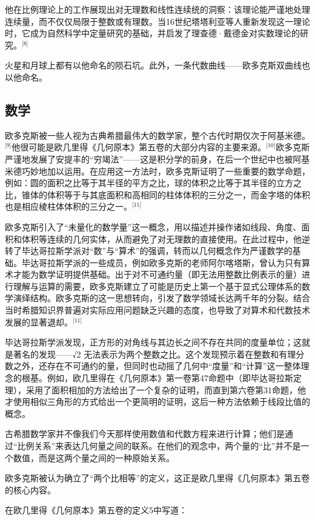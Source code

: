 他在比例理论上的工作展现出对无理数和线性连续统的洞察：该理论能严谨地处理连续量，而不仅仅局限于整数或有理数。当16世纪塔塔利亚等人重新发现这一理论时，它成为自然科学中定量研究的基础，并启发了理查德·戴德金对实数理论的研究。\(^\text{[8]}\)

火星和月球上都有以他命名的陨石坑。此外，一条代数曲线——欧多克斯双曲线也以他命名。
\subsection{数学}
欧多克斯被一些人视为古典希腊最伟大的数学家，整个古代时期仅次于阿基米德。\(^\text{[9]}\)他很可能是欧几里得《几何原本》第五卷的大部分内容的主要来源。\(^\text{[10]}\)欧多克斯严谨地发展了安提丰的“穷竭法”——这是积分学的前身，在后一个世纪中也被阿基米德巧妙地加以运用。在应用这一方法时，欧多克斯证明了一些重要的数学命题，例如：圆的面积之比等于其半径的平方之比，球的体积之比等于其半径的立方之比，锥体的体积等于与其底面积和高相同的柱体体积的三分之一，而金字塔的体积也是相应棱柱体体积的三分之一。\(^\text{[11]}\)

欧多克斯引入了“未量化的数学量”这一概念，用以描述并操作诸如线段、角度、面积和体积等连续的几何实体，从而避免了对无理数的直接使用。在此过程中，他逆转了毕达哥拉斯学派对“数”与“算术”的强调，转而以几何概念作为严谨数学的基础。毕达哥拉斯学派的一些成员，例如欧多克斯的老师阿尔喀塔斯，曾认为只有算术才能为数学证明提供基础。出于对不可通约量（即无法用整数比例表示的量）进行理解与运算的需要，欧多克斯建立了可能是历史上第一个基于显式公理体系的数学演绎结构。欧多克斯的这一思想转向，引发了数学领域长达两千年的分裂。结合当时希腊知识界普遍对实际应用问题缺乏兴趣的态度，也导致了对算术和代数技术发展的显著退却。\(^\text{[11]}\)

毕达哥拉斯学派发现，正方形的对角线与其边长之间不存在共同的度量单位；这就是著名的发现——√2 无法表示为两个整数之比。这个发现预示着在整数和有理分数之外，还存在不可通约的量，但同时也动摇了几何中“度量”和“计算”这一整体理念的根基。例如，欧几里得在《几何原本》第一卷第47命题中（即毕达哥拉斯定理），采用了面积相加的方法给出了一个复杂的证明，而直到第六卷第31命题，他才使用相似三角形的方式给出一个更简明的证明，这后一种方法依赖于线段比值的概念。

古希腊数学家并不像我们今天那样使用数值和代数方程来进行计算；他们是通过“比例关系”来表达几何量之间的联系。在他们的观念中，两个量的“比”并不是一个数值，而是这两个量之间的一种原始关系。

欧多克斯被认为确立了“两个比相等”的定义，这正是欧几里得《几何原本》第五卷的核心内容。

在欧几里得《几何原本》第五卷的定义5中写道：

